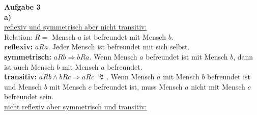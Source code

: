 \documentclass[a4paper]{scrartcl}
\begin{document}
	\begin{flushleft}
		\textbf{Aufgabe 3}\\
		\textbf{a)} \\
		\underline{reflexiv und symmetrisch aber nicht transitiv:}\\
		Relation: $R =$ Mensch $a$ ist befreundet mit Mensch $b$.\\
		\textbf{reflexiv:} $aRa$. Jeder Mensch ist befreundet mit sich selbst.\\
		\textbf{symmetrisch:} $aRb \Rightarrow bRa$. Wenn Mensch $a$ befreundet ist mit Mensch $b$, dann ist auch Mensch $b$ mit Mensch $a$ befreundet.\\
		\textbf{transitiv:} $aRb \wedge bRc\Rightarrow aRc$ $\mathbb{\lightning}$. Wenn Mensch $a$ mit Mensch $b$ befreundet ist und Mensch $b$ mit Mensch $c$ befreundet ist, muss Mensch $a$ nicht mit Mensch $c$ befreundet sein.\\[1em]
		\underline{nicht reflexiv aber symmetrisch und transitiv:}\\
	\end{flushleft}
\end{document}
